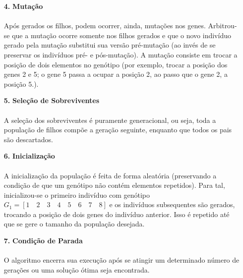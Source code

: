\documentclass{report}
\begin{document}
\begin{itemize}
		\item[\textbf{4.}] \textbf{Mutação}
		
		\paragraph{} Após gerados os filhos, podem ocorrer, ainda, mutações nos genes. Arbitrou-se que a mutação ocorre somente nos filhos gerados e que o novo indivíduo gerado pela mutação substitui sua versão pré-mutação (ao invés de se preservar os indivíduos pré- e pós-mutação). A mutação consiste em trocar a posição de dois elementos no genótipo (por exemplo, trocar a posição dos genes 2 e 5; o gene 5 passa a ocupar a posição 2, ao passo que o gene 2, a posição 5.).\\
		
		\item[\textbf{5.}] \textbf{Seleção de Sobreviventes}
		
		\paragraph{} A seleção dos sobreviventes é puramente generacional, ou seja, toda a população de filhos compõe a geração seguinte, enquanto que todos os pais são descartados.\\
		
		\item[\textbf{6.}] \textbf{Inicialização}
		
		\paragraph{} A inicialização da população é feita de forma aleatória (preservando a condição de que um genótipo não contém elementos repetidos). Para tal, inicializou-se o primeiro indivíduo com genótipo $G_1 = [1 \quad 2 \quad 3 \quad 4 \quad 5 \quad 6 \quad 7 \quad 8]$ e os indivíduos subsequentes são gerados, trocando a posição de dois genes do indivíduo anterior. Isso é repetido até que se gere o tamanho da população desejada.\\
		
		\item[\textbf{7.}] \textbf{Condição de Parada}
		
		\paragraph{} O algoritmo encerra sua execução após se atingir um determinado número de gerações ou uma solução ótima seja encontrada.\\
	\end{itemize}
	
\end{document}
